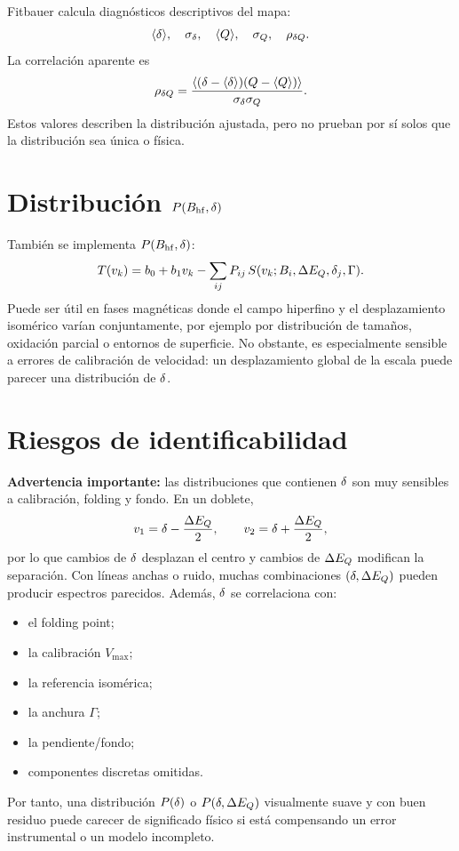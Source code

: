 Fitbauer calcula diagnósticos descriptivos del mapa:
\begin{align}
  \langle\delta\rangle,\quad \sigma_{\delta},\quad
  \langle Q\rangle,\quad \sigma_Q,\quad
  \rho_{\delta Q}.
\end{align}
La correlación aparente es
\begin{equation}
  \rho_{\delta Q}=\frac{\langle(\delta-\langle\delta\rangle)(Q-\langle Q\rangle)\rangle}
  {\sigma_{\delta}\sigma_Q}.
\end{equation}
Estos valores describen la distribución ajustada, pero no prueban por sí solos
que la distribución sea única o física.

\section{Distribución $P(B_{\mathrm{hf}},\delta)$}

También se implementa $P(B_{\mathrm{hf}},\delta)$:
\begin{equation}
  T(v_k)=b_0+b_1v_k-\sum_{ij}P_{ij}\,
  S(v_k;B_i,\Delta E_Q,\delta_j,\Gamma).
\end{equation}
Puede ser útil en fases magnéticas donde el campo hiperfino y el desplazamiento
isomérico varían conjuntamente, por ejemplo por distribución de tamaños,
oxidación parcial o entornos de superficie. No obstante, es especialmente
sensible a errores de calibración de velocidad: un desplazamiento global de la
escala puede parecer una distribución de $\delta$.

\section{Riesgos de identificabilidad}

\textbf{Advertencia importante:} las distribuciones que contienen $\delta$ son muy
sensibles a calibración, folding y fondo. En un doblete,
\begin{equation}
  v_1=\delta-\frac{\Delta E_Q}{2},\qquad v_2=\delta+\frac{\Delta E_Q}{2},
\end{equation}
por lo que cambios de $\delta$ desplazan el centro y cambios de $\Delta E_Q$ modifican la
separación. Con líneas anchas o ruido, muchas combinaciones $(\delta,\Delta E_Q)$ pueden
producir espectros parecidos. Además, $\delta$ se correlaciona con:
\begin{itemize}
  \item el folding point;
  \item la calibración $V_{\max}$;
  \item la referencia isomérica;
  \item la anchura $\Gamma$;
  \item la pendiente/fondo;
  \item componentes discretas omitidas.
\end{itemize}
Por tanto, una distribución $P(\delta)$ o $P(\delta,\Delta E_Q)$ visualmente suave y con buen
residuo puede carecer de significado físico si está compensando un error
instrumental o un modelo incompleto.

